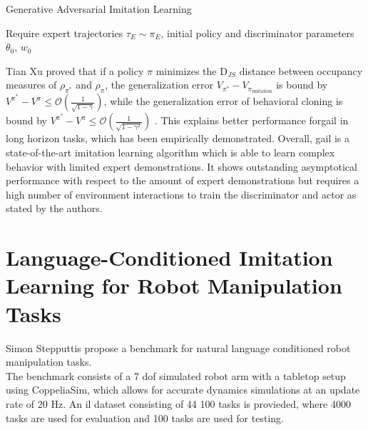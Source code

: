 \begin{algorithm}
    \caption{Generative Adversarial Imitation Learning}
    \label{GAIL_Algo_app}
    Require expert trajectories $\tau_E \sim \pi_E$, initial policy and discriminator parameters $\theta_0$, $w_0$\\
\end{algorithm}
Tian Xu \etAl proved that if a policy $\pi$ minimizes the $\text{D}_{JS}$ distance 
between occupancy measures of $\rho_{\pi^*}$ and $\rho_{\pi}$, the generalization error $V_{\pi^*} - V_{\pi_{\text{imitation}}}$ is bound by 
$V^{{\pi^*}} - V^{\pi} \leq \mathcal{O}\left(\frac{1}{\sqrt{1-\gamma}}\right)$, while the generalization error of behavioral cloning is bound by 
$V^{{\pi^*}} - V^{\pi} \leq \mathcal{O}\left(\frac{1}{\sqrt{1-\gamma^2}}\right)$ \cite{NEURIPS2020_b5c01503} . This explains better performance for\ac{gail} in long horizon tasks, which has 
been empirically demonstrated. Overall, \ac{gail} is a state-of-the-art imitation learning algorithm which is able to learn complex behavior with limited expert demonstrations. It shows outstanding 
asymptotical performance with respect to the amount of expert demonstrations but requires a high number of environment interactions to train the discriminator and actor as stated by the authors. 

\chapter{Language-Conditioned Imitation Learning for Robot Manipulation Tasks}
\label{LCILRM}
Simon Stepputtis \etAl \cite{stepputtis2020languageconditioned} propose a benchmark for natural language conditioned robot manipulation tasks. \\
The benchmark consists of a 7 dof simulated robot arm with a 
tabletop setup using CoppeliaSim, which allows for accurate dynamics simulations at an update rate of 20 Hz. 
An \ac{il} dataset consisting of 44 100 tasks is provieded, where 4000 tasks are used for 
evaluation and 100 tasks are used for testing.\\

